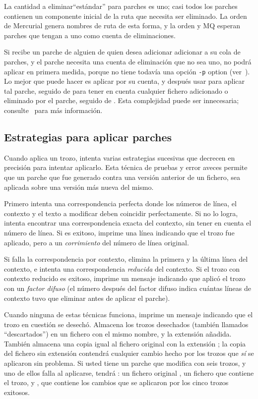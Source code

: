 La cantidad a eliminar``estándar'' para parches es uno; casi todos los
parches contienen un componente inicial de la ruta que necesita ser
eliminado.  La orden  de Mercurial genera nombres de ruta
de esta forma, y la orden  y MQ esperan parches que
tengan a uno como cuenta de eliminaciones.

Si recibe un parche de alguien de quien desea adicionar adicionar a su
cola de parches, y el parche necesita una cuenta de eliminación que no
sea uno, no podrá aplicar  en primera medida,
porque  no tiene todavía una opción \texttt{-p}
option (ver~).  Lo mejor que puede hacer es aplicar
 por su cuenta, y después usar 
para aplicar tal parche, seguido de  para tener en
cuenta cualquier fichero adicionado o eliminado por el parche, seguido
de .  Esta complejidad puede ser innecesaria;
consulte~ para más información.

\subsection{Estrategias para aplicar parches}

Cuando  aplica un trozo, intenta varias estrategias
sucesivas que decrecen en precisión para intentar aplicarlo.  Esta
técnica de pruebas y error aveces permite que un parche que fue
generado contra una versión anterior de un fichero, sea aplicada sobre
una versión más nueva del mismo.

Primero  intenta una correspondencia perfecta donde los
números de línea, el contexto y el texto a modificar deben coincidir
perfectamente.  Si no lo logra, intenta encontrar una correspondencia
exacta del contexto, sin tener en cuenta el número de línea.  Si es
exitoso, imprime una línea indicando que el trozo fue aplicado, pero a
un \emph{corrimiento} del número de línea original.

Si falla la correspondencia por contexto,  elimina la
primera y la última línea del contexto, e intenta una correspondencia
\emph{reducida} del contexto.  Si el trozo con contexto reducido es
exitoso, imprime un mensaje indicando que aplicó el trozo con un
\emph{factor difuso} (el número después del factor difuso indica
cuántas líneas de contexto  tuvo que eliminar antes de
aplicar el parche).

Cuando ninguna de estas técnicas funciona,  imprime un
mensaje indicando que el trozo en cuestión se desechó.  Almacena los
trozos desechados (también llamados ``descartados'') en un fichero con
el mismo nombre, y la extensión  añadida.  También
almacena una copia igual al fichero original con la extensión
; la copia del fichero sin extensión contendrá
cualquier cambio hecho por los trozos que \emph{sí} se aplicaron sin
problema.  Si usted tiene un parche que modifica  con
seis trozos, y uno de ellos falla al aplicarse, tendrá : un fichero
original , un fichero  que
contiene el trozo, y , que contiene los cambios que se
aplicaron por los cinco trozos exitosos.

